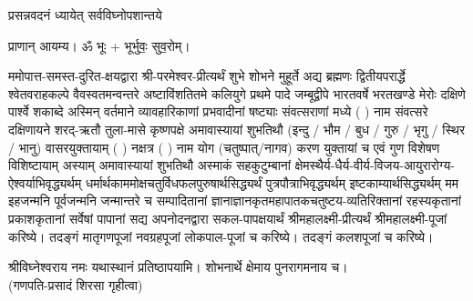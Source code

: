 
\setlength{\parindent}{0pt}


 

{प्रसन्नवदनं ध्यायेत् सर्वविघ्नोपशान्तये}
 
प्राणान्  आयम्य।  ॐ भूः + भूर्भुवः॒ सुव॒रोम्।


ममोपात्त-समस्त-दुरित-क्षयद्वारा श्री-परमेश्वर-प्रीत्यर्थं शुभे शोभने मुहूर्ते अद्य ब्रह्मणः
द्वितीयपरार्द्धे श्वेतवराहकल्पे वैवस्वतमन्वन्तरे अष्टाविंशतितमे कलियुगे प्रथमे पादे
जम्बूद्वीपे भारतवर्षे भरतखण्डे मेरोः दक्षिणे पार्श्वे शकाब्दे अस्मिन् वर्तमाने व्यावहारिकाणां प्रभवादीनां षष्ट्याः संवत्सराणां मध्ये (  ) नाम संवत्सरे दक्षिणायने 
शरद्-ऋतौ तुला-मासे कृष्णपक्षे अमावास्यायां शुभतिथौ
(इन्दु / भौम / बुध / गुरु / भृगु / स्थिर / भानु) वासरयुक्तायाम्
(  ) नक्षत्र (  ) नाम  योग  (चतुष्पात्/नागव) करण युक्तायां च एवं गुण विशेषण विशिष्टायाम्
अस्याम् अमावास्यायां शुभतिथौ 
अस्माकं सहकुटुम्बानां क्षेमस्थैर्य-धैर्य-वीर्य-विजय-आयुरारोग्य-ऐश्वर्याभिवृद्ध्यर्थम्
 धर्मार्थकाममोक्ष\-चतुर्विधफलपुरुषार्थसिद्ध्यर्थं पुत्रपौत्राभि\-वृद्ध्यर्थम् इष्टकाम्यार्थसिद्ध्यर्थम्
मम इहजन्मनि पूर्वजन्मनि जन्मान्तरे च सम्पादितानां ज्ञानाज्ञानकृतमहा\-पातकचतुष्टय-व्यतिरिक्तानां रहस्यकृतानां प्रकाशकृतानां सर्वेषां पापानां सद्य अपनोदनद्वारा सकल-पापक्षयार्थं
श्रीमहालक्ष्मी-प्रीत्यर्थं श्रीमहालक्ष्मी-पूजां करिष्ये। तदङ्गं मातृगणपूजां नवग्रहपूजां लोकपाल-पूजां च करिष्ये। 
तदङ्गं कलशपूजां च करिष्ये। 


श्रीविघ्नेश्वराय नमः यथास्थानं प्रतिष्ठापयामि। शोभनार्थे क्षेमाय पुनरागमनाय च।\\
(गणपति-प्रसादं शिरसा गृहीत्वा)


















